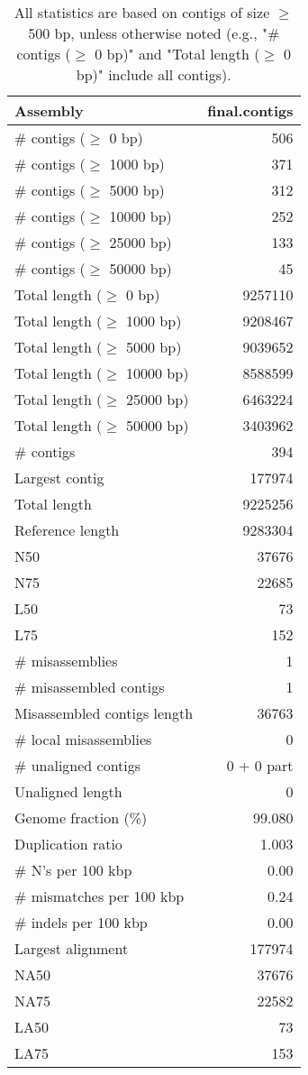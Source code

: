 \documentclass[12pt,a4paper]{article}
\begin{document}
\begin{table}[ht]
\begin{center}
\caption{All statistics are based on contigs of size $\geq$ 500 bp, unless otherwise noted (e.g., "\# contigs ($\geq$ 0 bp)" and "Total length ($\geq$ 0 bp)" include all contigs).}
\begin{tabular}{|l*{1}{|r}|}
\hline
Assembly & final.contigs \\ \hline
\# contigs ($\geq$ 0 bp) & 506 \\ \hline
\# contigs ($\geq$ 1000 bp) & 371 \\ \hline
\# contigs ($\geq$ 5000 bp) & 312 \\ \hline
\# contigs ($\geq$ 10000 bp) & 252 \\ \hline
\# contigs ($\geq$ 25000 bp) & 133 \\ \hline
\# contigs ($\geq$ 50000 bp) & 45 \\ \hline
Total length ($\geq$ 0 bp) & 9257110 \\ \hline
Total length ($\geq$ 1000 bp) & 9208467 \\ \hline
Total length ($\geq$ 5000 bp) & 9039652 \\ \hline
Total length ($\geq$ 10000 bp) & 8588599 \\ \hline
Total length ($\geq$ 25000 bp) & 6463224 \\ \hline
Total length ($\geq$ 50000 bp) & 3403962 \\ \hline
\# contigs & 394 \\ \hline
Largest contig & 177974 \\ \hline
Total length & 9225256 \\ \hline
Reference length & 9283304 \\ \hline
N50 & 37676 \\ \hline
N75 & 22685 \\ \hline
L50 & 73 \\ \hline
L75 & 152 \\ \hline
\# misassemblies & 1 \\ \hline
\# misassembled contigs & 1 \\ \hline
Misassembled contigs length & 36763 \\ \hline
\# local misassemblies & 0 \\ \hline
\# unaligned contigs & 0 + 0 part \\ \hline
Unaligned length & 0 \\ \hline
Genome fraction (\%) & 99.080 \\ \hline
Duplication ratio & 1.003 \\ \hline
\# N's per 100 kbp & 0.00 \\ \hline
\# mismatches per 100 kbp & 0.24 \\ \hline
\# indels per 100 kbp & 0.00 \\ \hline
Largest alignment & 177974 \\ \hline
NA50 & 37676 \\ \hline
NA75 & 22582 \\ \hline
LA50 & 73 \\ \hline
LA75 & 153 \\ \hline
\end{tabular}
\end{center}
\end{table}
\end{document}
